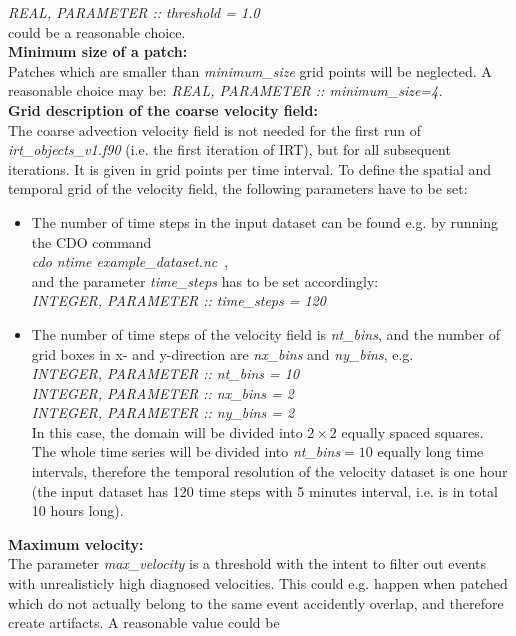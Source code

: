\documentclass[11pt]{article}
\begin{document}
{\it REAL, PARAMETER       :: threshold = 1.0}\\
could be a reasonable choice.\vspace{0.5cm} \\
{\bf Minimum size of a patch:}\\
Patches which are smaller than {\it minimum\_size} grid points will be neglected. A reasonable choice may be:
{\it REAL, PARAMETER       :: minimum\_size=4.}\vspace{0.5cm} \\
{\bf Grid description of the coarse velocity field:}\\
The coarse advection velocity field is not needed for the first run of {\it irt\_objects\_v1.f90} (i.e. the first iteration of IRT), but for all subsequent iterations. It is given in grid points per time interval. To define the spatial and temporal grid of the velocity field, the following parameters have to be set:
\begin{itemize}
\item The number of time steps in the input dataset can be found e.g. by running the CDO command\\
{\it cdo ntime example\_dataset.nc}\, ,\\
and the parameter {\it time\_steps} has to be set accordingly:\\
{\it INTEGER, PARAMETER    :: time\_steps = 120}
\item The number of time steps of the velocity field is {\it nt\_bins}, and the number of grid boxes in x- and y-direction are {\it nx\_bins} and {\it ny\_bins}, e.g.\\
{\it INTEGER, PARAMETER    ::  nt\_bins = 10}\\
{\it INTEGER, PARAMETER    ::  nx\_bins = 2}\\
{\it INTEGER, PARAMETER    ::  ny\_bins = 2}\\
In this case, the domain will be divided into $2\times 2$ equally spaced squares. The whole time series will be divided into {\it nt\_bins}$=10$ equally long time intervals, therefore the temporal resolution of the velocity dataset is one hour (the input dataset has 120 time steps with 5 minutes interval, i.e. is in total 10 hours long).
\end{itemize}\vspace{0.5cm}
{\bf Maximum velocity:}\\
The parameter {\it max\_velocity} is a threshold with the intent to filter out events with unrealisticly high diagnosed velocities. This could e.g. happen when patched which do not actually belong to the same event accidently overlap, and therefore create artifacts. A reasonable value could be\\
\end{document}
